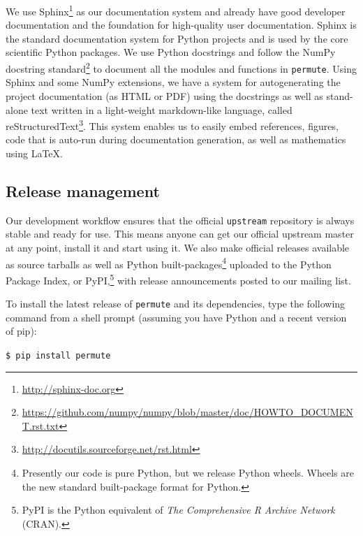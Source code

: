 \documentclass[]{article}
\begin{document}
We use Sphinx\footnote{\url{http://sphinx-doc.org}} as our documentation system
and already have good developer documentation and the foundation for
high-quality user documentation.
Sphinx is the standard documentation system for Python projects and is used by
the core scientific Python packages.
We use Python docstrings and follow the NumPy docstring
standard\footnote{\url{https://github.com/numpy/numpy/blob/master/doc/HOWTO\_DOCUMENT.rst.txt}}
to document all the modules and functions in \texttt{permute}.
Using Sphinx and some NumPy extensions, we have a system for autogenerating the
project documentation (as HTML or PDF) using the docstrings as well as
stand-alone text written in a light-weight markdown-like language, called
reStructuredText\footnote{\url{http://docutils.sourceforge.net/rst.html}}.
This system enables us to easily embed references, figures, code that is
auto-run during documentation generation, as well as mathematics using \LaTeX.

\subsection{\label{sec:release}Release management}

Our development workflow ensures that the official \texttt{upstream} repository
is always stable and ready for use.
This means anyone can get our official upstream master at any point, install it
and start using it.
We also make official releases available as source tarballs as well as Python
built-packages\footnote{Presently our code is pure Python, but we release
Python wheels.
Wheels are the new standard built-package format for Python.} uploaded to the
Python Package Index, or PyPI,\footnote{PyPI is the Python equivalent of \emph{The
Comprehensive R Archive Network} (CRAN).} with release announcements posted to
our mailing list.

To install the latest release of \texttt{permute} and its dependencies, type
the following command from a shell prompt (assuming you have Python and a
recent version of pip):

\texttt{\$ pip install permute}
\end{document}
